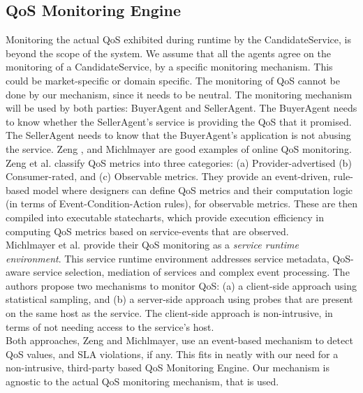 \documentclass[10pt,journal,compsoc]{IEEEtran}
\begin{document}
\subsection{QoS Monitoring Engine}
Monitoring the actual QoS exhibited during runtime by the CandidateService, is beyond the scope of the system. We assume that all the agents agree on the monitoring of a CandidateService, by a specific monitoring mechanism. This could be market-specific or domain specific. The monitoring of QoS cannot be done by our mechanism, since it needs to be neutral. The monitoring mechanism will be used by both parties: BuyerAgent and SellerAgent. The BuyerAgent needs to know whether the SellerAgent's service is providing the QoS that it promised. The SellerAgent needs to know that the BuyerAgent's application is not abusing the service. Zeng \cite{Zeng2007Monitoring}, and Michlmayer\cite{Michlmayr2009Comprehensive} are good examples of online QoS monitoring. Zeng et al. classify QoS metrics into three categories: (a) Provider-advertised (b) Consumer-rated, and (c) Observable metrics. They provide an event-driven, rule-based model where designers can define QoS metrics and their computation logic (in terms of Event-Condition-Action rules), for observable metrics. These are then compiled into executable statecharts, which provide execution efficiency in computing QoS metrics based on service-events that are observed. \\
Michlmayer et al. provide their QoS monitoring as a \textit{service runtime environment}. This service runtime environment addresses service metadata, QoS-aware service selection, mediation of services and complex event processing. The authors propose two mechanisms to monitor QoS: (a) a client-side approach using statistical sampling, and (b) a server-side approach using probes that are present on the same host as the service. The client-side approach is non-intrusive, in terms of not needing access to the service's host. \\
Both approaches, Zeng and Michlmayer, use an event-based mechanism to detect QoS values, and SLA violations, if any. This fits in neatly with our need for a non-intrusive, third-party based QoS Monitoring Engine. Our mechanism is agnostic to the actual QoS monitoring mechanism, that is used. 
\end{document}
